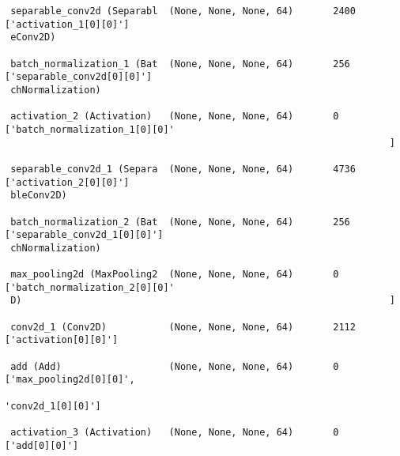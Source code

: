 \documentclass[
  letterpaper,
  DIV=11,
  numbers=noendperiod]{scrreprt}
\begin{document}
\begin{verbatim}
 separable_conv2d (Separabl  (None, None, None, 64)       2400      ['activation_1[0][0]']        
 eConv2D)                                                                                         
                                                                                                  
 batch_normalization_1 (Bat  (None, None, None, 64)       256       ['separable_conv2d[0][0]']    
 chNormalization)                                                                                 
                                                                                                  
 activation_2 (Activation)   (None, None, None, 64)       0         ['batch_normalization_1[0][0]'
                                                                    ]                             
                                                                                                  
 separable_conv2d_1 (Separa  (None, None, None, 64)       4736      ['activation_2[0][0]']        
 bleConv2D)                                                                                       
                                                                                                  
 batch_normalization_2 (Bat  (None, None, None, 64)       256       ['separable_conv2d_1[0][0]']  
 chNormalization)                                                                                 
                                                                                                  
 max_pooling2d (MaxPooling2  (None, None, None, 64)       0         ['batch_normalization_2[0][0]'
 D)                                                                 ]                             
                                                                                                  
 conv2d_1 (Conv2D)           (None, None, None, 64)       2112      ['activation[0][0]']          
                                                                                                  
 add (Add)                   (None, None, None, 64)       0         ['max_pooling2d[0][0]',       
                                                                     'conv2d_1[0][0]']            
                                                                                                  
 activation_3 (Activation)   (None, None, None, 64)       0         ['add[0][0]']                 
                                                                                                  

\end{verbatim}
\end{document}
